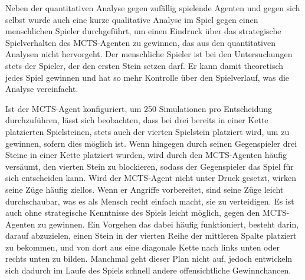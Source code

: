 Neben der quantitativen Analyse gegen zufällig spielende Agenten und gegen sich selbst wurde auch eine kurze qualitative Analyse im Spiel gegen einen menschlichen Spieler durchgeführt, um einen Eindruck über das strategische Spielverhalten des MCTS-Agenten zu gewinnen, das aus den quantitativen Analysen nicht hervorgeht. Der menschliche Spieler ist bei den Untersuchungen stets der Spieler, der den ersten Stein setzen darf. Er kann damit theoretisch jedes Spiel gewinnen und hat so mehr Kontrolle über den Spielverlauf, was die Analyse vereinfacht.

Ist der MCTS-Agent konfiguriert, um 250 Simulationen pro Entscheidung durchzuführen, lässt sich beobachten, dass bei drei bereits in einer Kette platzierten Spielsteinen, stets auch der vierten Spielstein platziert wird, um zu gewinnen, sofern dies möglich ist. Wenn hingegen durch seinen Gegenspieler drei Steine in einer Kette platziert wurden, wird durch den MCTS-Agenten häufig versäumt, den vierten Stein zu blockieren, sodass der Gegenspieler das Spiel für sich entscheiden kann. Wird der MCTS-Agent nicht unter Druck gesetzt, wirken seine Züge häufig ziellos. Wenn er Angriffe vorbereitet, sind seine Züge leicht durchschaubar, was es als Mensch recht einfach macht, sie zu verteidigen. Es ist auch ohne strategische Kenntnisse des Spiels leicht möglich, gegen den MCTS-Agenten zu gewinnen. Ein Vorgehen das dabei häufig funktioniert, besteht darin, darauf abzuzielen, einen Stein in der vierten Reihe der mittleren Spalte platziert zu bekommen, und von dort aus eine diagonale Kette nach links unten oder rechts unten zu bilden. Manchmal geht dieser Plan nicht auf, jedoch entwickeln sich dadurch im Laufe des Spiels schnell andere offensichtliche Gewinnchancen.

